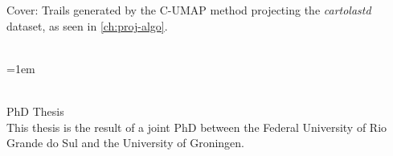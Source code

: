 \thispagestyle{empty}

\hyphenation{}

\null
\vfill

\noindent Cover: Trails generated by the C-UMAP method projecting the \emph{cartolastd} dataset, as seen in \cref{ch:proj-algo}.
\vspace{1.5cm}

\noindent\myTitle\\
\hangindent=1em

\noindent \myName\\
PhD Thesis\\

\vspace{1.5cm}
\noindent This thesis is the result of a joint PhD between the Federal University of Rio Grande do Sul and the University of Groningen. \\

\vspace{1.5cm}


